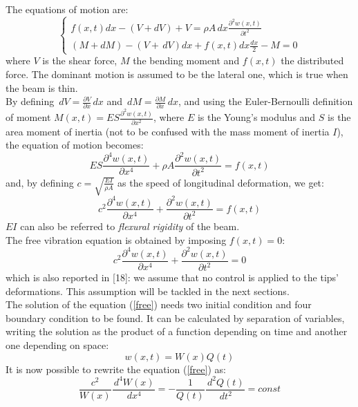 \documentclass[a4paper,12pt,oneside]{report}
\begin{document}
The equations of motion are:
\begin{equation}
\begin{cases}
f(x,t)dx-(V+dV)+V=\rho A \,dx \frac{\partial^2w(x,t)}{\partial t^2}\\
(M+dM)-(V+\,dV)dx+f(x,t)dx\frac{dx}{2}-M=0
\end{cases}
\end{equation}
where $V$ is the shear force, $M$ the bending moment and $f(x,t)$ the distributed force. The dominant motion is assumed to be the lateral one, which is true when the beam is thin.\\
By defining $\,dV=\frac{\partial V}{\partial x}\,dx$ and $\,dM=\frac{\partial M}{\partial x}\,dx$, and using the Euler-Bernoulli definition of moment $M(x,t)=ES\frac{\partial^2 w(x,t)}{\partial x^2}$, where $E$ is the Young's modulus and $S$ is the area moment of inertia (not to be confused with the mass moment of inertia $I$), the equation of motion becomes:
\begin{equation}
  ES\frac{\partial^4w(x,t)}{\partial x^4}+\rho A\frac{\partial^2w(x,t)}{\partial t^2}=f(x,t)
\end{equation}
and, by defining $c=\sqrt{\frac{EI}{\rho A}}$ as the speed of longitudinal deformation, we get:
\begin{equation}
c^2\frac{\partial^4w(x,t)}{\partial x^4}+\frac{\partial^2w(x,t)}{\partial t^2}=f(x,t)
\label{forced}
\end{equation}
$EI$ can also be referred to \textit{flexural rigidity} of the beam.\\
The free vibration equation is obtained by imposing $f(x,t)=0$:\\
 \begin{equation}
c^2\frac{\partial^4w(x,t)}{\partial x^4}+\frac{\partial^2w(x,t)}{\partial t^2}=0
\label{free}
\end{equation}
which is also reported in [18]: we assume that no control is applied to the tips' deformations. This assumption will be tackled in the next sections.\\
The solution of the equation (\ref{free}) needs two initial condition and four boundary condition to be found. It can be calculated by separation of variables, writing the solution as the product of a function depending on time and another one depending on space:
\begin{equation}
w(x,t)=W(x)Q(t)
\label{separability}
\end{equation}
It is now possible to rewrite the equation (\ref{free}) as:
\begin{equation}
\frac{c^2}{W(x)}\frac{\,d^4W(x)}{\,dx^4}=-\frac{1}{Q(t)}\frac{\,d^2Q(t)}{\,dt^2}=const
\end{equation}
\end{document}
